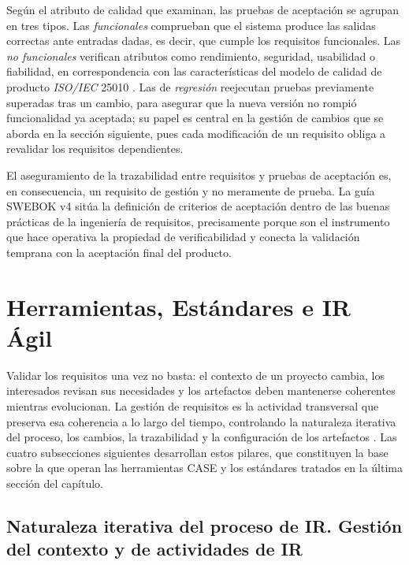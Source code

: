 \documentclass[11pt,a4paper,oneside]{report}
\begin{document}
	Seg\'un el atributo de calidad que examinan, las pruebas de aceptaci\'on se agrupan en tres tipos. Las \textit{funcionales} comprueban que el sistema produce las salidas correctas ante entradas dadas, es decir, que cumple los requisitos funcionales. Las \textit{no funcionales} verifican atributos como rendimiento, seguridad, usabilidad o fiabilidad, en correspondencia con las caracter\'isticas del modelo de calidad de producto \textit{ISO/IEC} 25010 \citep{iso25010_2023}. Las de \textit{regresi\'on} reejecutan pruebas previamente superadas tras un cambio, para asegurar que la nueva versi\'on no rompi\'o funcionalidad ya aceptada; su papel es central en la gesti\'on de cambios que se aborda en la secci\'on siguiente, pues cada modificaci\'on de un requisito obliga a revalidar los requisitos dependientes.
	
	El aseguramiento de la trazabilidad entre requisitos y pruebas de aceptaci\'on es, en consecuencia, un requisito de gesti\'on y no meramente de prueba. La gu\'ia SWEBOK v4 \citep{swebok_v4_2024} sit\'ua la definici\'on de criterios de aceptaci\'on dentro de las buenas pr\'acticas de la ingenier\'ia de requisitos, precisamente porque son el instrumento que hace operativa la propiedad de verificabilidad y conecta la validaci\'on temprana con la aceptaci\'on final del producto.
	
	\section{Herramientas, Est\'andares e IR \'Agil}
	
	Validar los requisitos una vez no basta: el contexto de un proyecto cambia, los interesados revisan sus necesidades y los artefactos deben mantenerse coherentes mientras evolucionan. La gesti\'on de requisitos es la actividad transversal que preserva esa coherencia a lo largo del tiempo, controlando la naturaleza iterativa del proceso, los cambios, la trazabilidad y la configuraci\'on de los artefactos \citep{pohl_2010,iso29148_2018}. Las cuatro subsecciones siguientes desarrollan estos pilares, que constituyen la base sobre la que operan las herramientas CASE y los est\'andares tratados en la \'ultima secci\'on del cap\'itulo.
	
	\subsection{Naturaleza iterativa del proceso de IR. Gesti\'on del contexto y de actividades de IR}
	
\end{document}
